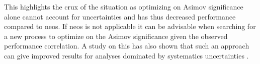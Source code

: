 This highlights the crux of the situation as optimizing on Asimov significance alone cannot account for uncertainties and has thus decreased performance compared to \ac{neos}. If \ac{neos} is not applicable it can be advisable when searching for a new process to optimize on the Asimov significance given the observed performance correlation. A study on this has also shown that such an approach can give improved results for analyses dominated by systematics uncertainties \citep{elwood2018direct}.
